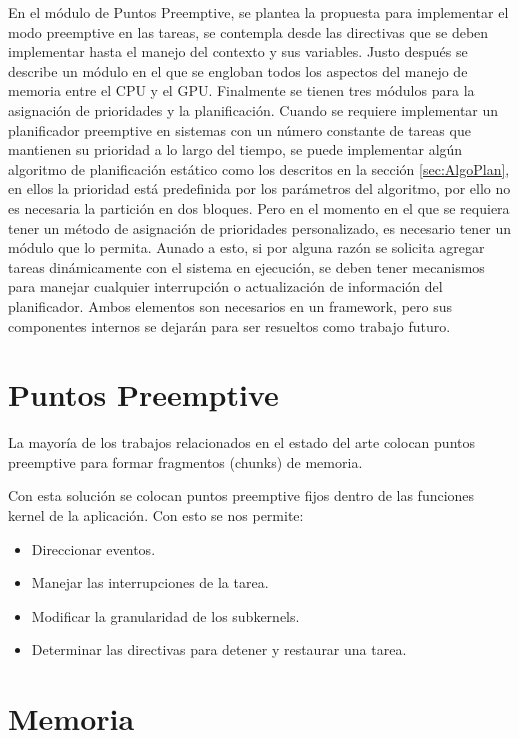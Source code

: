   En el módulo de Puntos Preemptive, se plantea la propuesta para implementar el modo preemptive en las tareas, se contempla desde las directivas que se deben implementar hasta el manejo del contexto y sus variables.
  Justo después se describe un módulo en el que se engloban todos los aspectos del manejo de memoria entre el CPU y el GPU.
  Finalmente se tienen tres módulos para la asignación de prioridades y la planificación. 
  \vspace{0.3cm}
  Cuando se requiere implementar un planificador preemptive en sistemas con un número constante de tareas que mantienen su prioridad a lo largo del tiempo, se puede implementar algún algoritmo de planificación estático como los descritos en la sección \ref{sec:AlgoPlan}, en ellos la prioridad está predefinida por los parámetros del algoritmo, por ello no es necesaria la partición en dos bloques. 
  \vspace{0.3cm}
  Pero en el momento en el que se requiera tener un método de asignación de prioridades personalizado, es necesario tener un módulo que lo permita. Aunado a esto, si por alguna razón se solicita agregar tareas dinámicamente con el sistema en ejecución, se deben tener mecanismos para manejar cualquier interrupción o actualización de información del planificador. Ambos elementos son necesarios en un framework, pero sus componentes internos se dejarán para ser resueltos como trabajo futuro.
  
  \section{Puntos Preemptive}\label{puntosPreemptive}

La mayoría de los trabajos relacionados en el estado del arte colocan puntos preemptive para formar fragmentos (chunks) de memoria.

Con esta solución se colocan puntos preemptive fijos dentro de las funciones kernel de la aplicación. Con esto se nos permite:

\begin{itemize}
\item Direccionar eventos.
\item Manejar las interrupciones de la tarea.
\item Modificar la granularidad de los subkernels.
\item Determinar las directivas para detener y restaurar una tarea.
\end{itemize}     
  
  \section{Memoria}
  
